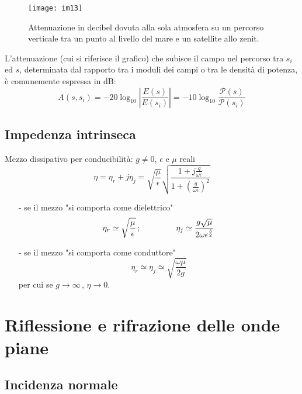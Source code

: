 \documentclass[a4paper]{article}
\begin{document}
\begin{figure}[ht] 
\centering
\texttt{[image: im13]}
\caption{Attenuazione in decibel dovuta alla sola atmosfera su un percorso verticale tra un punto al livello del mare e un satellite allo zenit.}
\end{figure}
L'attenuazione (cui si riferisce il grafico) che subisce il campo nel percorso tra $s_i$ ed $s$, determinata dal rapporto tra i moduli dei campi o tra le densità di potenza, è comunemente espressa in dB:
\begin{equation*}
A(s,s_i)=-20\log_{10}\left|\frac{E(s)}{E(s_i)}\right|=-10\log_{10}\frac{\mathcal{P}(s)}{\mathcal{P}(s_i)}
\end{equation*}
\subsection*{Impedenza intrinseca}
Mezzo dissipativo per conducibilità: $g\neq 0$, $\epsilon$ e $\mu$ reali
\begin{equation*}
\eta=\eta_r+j\eta_j=\sqrt{\frac{\mu}{\epsilon}}\sqrt{\frac{1+j\frac{g}{\omega\epsilon}}{1+\left(\frac{g}{\omega\epsilon}\right)^2}}
\end{equation*}
\begin{itemize}
\item[-] se il mezzo "si comporta come dielettrico"
\begin{equation*}
\eta_r\simeq\sqrt{\frac{\mu}{\epsilon}}\,;\hspace{15mm}\eta_j\simeq\frac{g\sqrt{\mu}}{2\omega\epsilon^{\frac{3}{2}}}
\end{equation*}
\item[-] se il mezzo "si comporta come conduttore"
\begin{equation*}
\eta_r\simeq\eta_j\simeq\sqrt{\frac{\omega\mu}{2g}}
\end{equation*}
per cui se $g\rightarrow\infty\,$, $\eta\rightarrow0$.
\end{itemize}
\section{Riflessione e rifrazione delle onde piane}
\subsection*{Incidenza normale}
\end{document}
